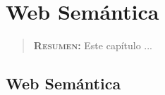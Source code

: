 


\chapter{Web Semántica}
\label{ch:web-semantinca}

\begin{quote}
  {\bf\textsc{Resumen:}} Este capítulo ...
\end{quote}

\section{Web Semántica}





